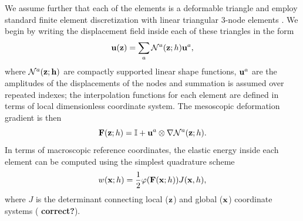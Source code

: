 \documentclass[aps,
superscriptaddress,notitlepage]{revtex4-1}
\def\phi{\varphi}
\begin{document}
We assume further that each  of the  elements  is a deformable triangle and  employ standard finite element discretization with linear triangular 3-node elements  \cite{Irons1966} . We begin by  writing  the displacement field  inside each of these triangles  in the form 
\begin{equation}
 {\bf u} ({\bf z}) = \sum_{a } \mathcal{N} ^a({\bf z};h) {\bf u}^a,
 \end{equation}
 where ${\mathcal N}^a(\bf z;h)$ are   compactly supported  linear shape functions,  ${\bf u}^a$ are the amplitudes of the displacements of the nodes and summation is assumed over repeated indexes; the interpolation functions for each element are defined in terms of   local  dimensionless coordinate system. The mesoscopic deformation gradient is then 
 \begin{equation}
 {\bf F}({\bf z}; h) =\mathbb{I}+ {\bf u} ^a\otimes\nabla\mathcal{N} ^a({\bf z};h). 
 \end{equation}
 In terms of macroscopic reference coordinates,  the elastic energy inside each element can be  computed using the simplest   quadrature scheme 
\begin{equation}
w ({\bf x}; h)=\frac{1}{2}  \phi({\bf F} ({\bf x}; h)) J({\bf x},h),
\end{equation}
where $J$ is the determinant connecting local ($\bf z$)   and global ($\bf x$) coordinate systems (\textbf{ correct?}). 
 
\end{document}

